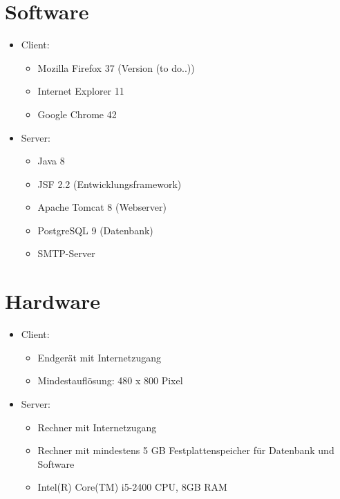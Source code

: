 \documentclass[a4paper]{scrreprt}
\begin{document}
	\section{Software}
        \begin{itemize}
      		\item Client:
	      		\begin{itemize}
	      			\item Mozilla Firefox 37 (Version (to do..))
	      			\item Internet Explorer 11
	      			\item Google Chrome 42
	      		\end{itemize}
          	\item Server:
	            \begin{itemize}
	            	\item Java 8
	            	\item JSF 2.2 (Entwicklungsframework)
	            	\item Apache Tomcat 8 (Webserver)
	            	\item PostgreSQL 9 (Datenbank)
	            	\item SMTP-Server
	            \end{itemize}
        \end{itemize}
        
    \section{Hardware}   
        \begin{itemize}
          	\item Client:
	            \begin{itemize}
	            	\item Endgerät mit Internetzugang
	            	\item Mindestauflösung: 480 x 800 Pixel
	            \end{itemize}
          	\item Server:
	           \begin{itemize}
	           	\item Rechner mit Internetzugang
	           	\item Rechner mit mindestens 5 GB Festplattenspeicher für Datenbank und Software
	           	\item Intel(R) Core(TM) i5-2400 CPU, 8GB RAM 
	           \end{itemize}
        \end{itemize}
\end{document}
